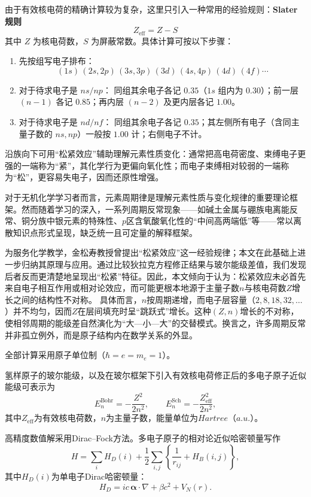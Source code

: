 \documentclass[UTF8]{ctexbook}
\begin{document}
由于有效核电荷的精确计算较为复杂，这里只引入一种常用的经验规则：\textbf{Slater 规则}
\[
Z_{\mathrm{eff}} = Z - S
\]
其中 $Z$ 为核电荷数，$S$ 为屏蔽常数。具体计算可按以下步骤：
\begin{enumerate}
  \item 先按组写电子排布：
  \[(1s)\,(2s,2p)\,(3s,3p)\,(3d)\,(4s,4p)\,(4d)\,(4f)\cdots\]
  \item 对于待求电子是 $ns/np$：
  同组其余电子各记 $0.35$（$1s$ 组内为 $0.30$）；前一层 $(n-1)$ 各记 $0.85$；再内层 $(n-2)$ 及更内层各记 $1.00$。
  \item 对于待求电子是 $nd/nf$：
  同组其余电子各记 $0.35$；其左侧所有电子（含同主量子数的 $ns,np$）一般按 $1.00$ 计；右侧电子不计。
\end{enumerate}

沿族向下可用“松紧效应”辅助理解元素性质变化：通常把高电荷密度、束缚电子更强的一端称为“紧”，其化学行为更偏向氧化性；而电子束缚相对较弱的一端称为“松”，更容易失电子，因而还原性增强。

对于无机化学学习者而言，元素周期律是理解元素性质与变化规律的重要理论框架。然而随着学习的深入，一系列周期反常现象——如碱土金属与硼族电离能反常、铜分族中银元素的特殊性、$p$区含氧酸氧化性的“中间高两端低”等——常以离散知识点形式呈现，缺乏统一且可定量的解释框架。

为服务化学教学，金松寿教授曾提出“松紧效应”这一经验规律；本文在此基础上进一步归纳其原理与应用。通过比较狄拉克方程修正结果与玻尔能级差值，我们发现后者反而更清楚地呈现出“松紧”特征。因此，本文倾向于认为：松紧效应未必首先来自电子相互作用或相对论效应，而可能更根本地源于主量子数$n$与核电荷数$Z$增长之间的结构性不对称。
具体而言，$n$按周期递增，而电子层容量（$2, 8, 18, 32, \ldots$）并不均匀，因而$Z$在层间填充时呈“跳跃式”增长。这种$(Z,n)$增长的不对称，使相邻周期的能级差自然演化为“大—小—大”的交替模式。换言之，许多周期反常并非孤立例外，而是原子结构内在数学关系的外显。

全部计算采用原子单位制（$\hbar=e=m_e=1$）。



氢样原子的玻尔能级，以及在玻尔框架下引入有效核电荷修正后的多电子原子近似能级可表示为
\[
E_n^{\mathrm{Bohr}}=-\frac{Z^2}{2n^2},\qquad E_n^{\mathrm{Sch}}=-\frac{Z_{\mathrm{eff}}^2}{2n^2},
\]
其中$Z_{\mathrm{eff}}$为有效核电荷数，$n$为主量子数，能量单位为$Hartree$（$a.u.$）。



高精度数值解采用Dirac--Fock方法。多电子原子的相对论近似哈密顿量写作
\[
H = \sum_i H_D(i) + \frac{1}{2} \sum_{i,j} \left\{ \frac{1}{r_{ij}} + H_B(i,j) \right\},
\]
其中$H_D(i)$为单电子Dirac哈密顿量：
\[
H_D = i c \, \boldsymbol{\alpha} \cdot \nabla + \beta c^2 + V_N(r).
\]
\end{document}
